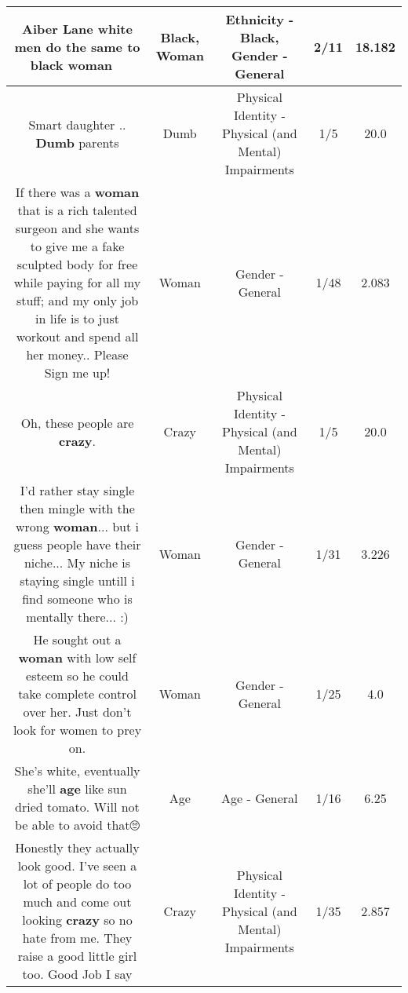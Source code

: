 \documentclass[11pt]{article}
\newlength\mylength
\begin{document}
\begin{center}
\begin{longtable}{|C{.65\mylength}|C{.30\mylength}|C{.12\mylength}|C{.12\mylength}|C{.12\mylength}|}
  \small Aiber Lane white men do the same to \textbf{black} \textbf{woman} 🤷‍♂️\normalsize   & Black, Woman & Ethnicity - Black, Gender - General & 2/11 & 18.182 \\  \hline
  \small Smart daughter .. \textbf{Dumb} parents\normalsize   & Dumb & Physical Identity - Physical (and Mental) Impairments & 1/5 & 20.0 \\  \hline
  \small If there was a \textbf{woman} that is a rich talented surgeon and she wants to give me a fake sculpted body for free while paying for all my stuff; and my only job in life is to just workout and spend all her money.. Please Sign me up!\normalsize   & Woman & Gender - General & 1/48 & 2.083 \\  \hline
  \small Oh, these people are \textbf{crazy}.\normalsize   & Crazy & Physical Identity - Physical (and Mental) Impairments & 1/5 & 20.0 \\  \hline
  \small I'd rather stay single then mingle with the wrong \textbf{woman}... but i guess people have their niche... My niche is staying single untill i find someone who is mentally there... :)\normalsize   & Woman & Gender - General & 1/31 & 3.226 \\  \hline
  \small He sought out a \textbf{woman} with low self esteem so he could take complete control over her. Just don't look for women to prey on.\normalsize   & Woman & Gender - General & 1/25 & 4.0 \\  \hline
  \small She's white, eventually she'll \textbf{age} like sun dried tomato. Will not be able to avoid that🙄\normalsize   & Age & Age - General & 1/16 & 6.25 \\  \hline
  \small Honestly they actually look good. I've seen a lot of people do too much and come out looking \textbf{crazy} so no hate from me. They raise a good little girl too. Good Job I say\normalsize   & Crazy & Physical Identity - Physical (and Mental) Impairments & 1/35 & 2.857 \\  \hline

\end{longtable}
\end{center}
\end{document}
